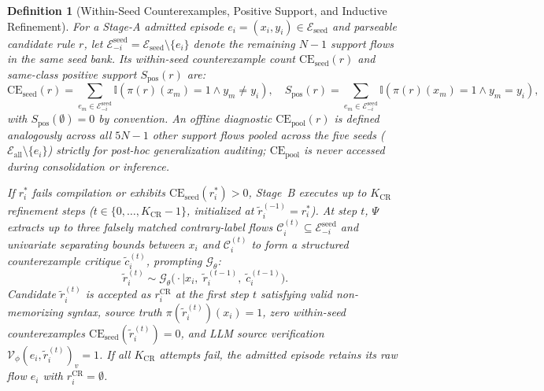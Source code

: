 \documentclass[11pt,letterpaper,onecolumn]{article}
\newtheorem{definition}{Definition}
\begin{document}
\begin{definition}[Within-Seed Counterexamples, Positive Support, and Inductive Refinement]
For a Stage-A admitted episode $e_i=(x_i,y_i) \in \mathcal{E}_{\mathrm{seed}}$ and parseable candidate rule $r$, let $\mathcal{E}_{-i}^{\mathrm{seed}} = \mathcal{E}_{\mathrm{seed}} \setminus \{e_i\}$ denote the remaining $N-1$ support flows in the same seed bank. Its within-seed counterexample count $\mathrm{CE}_{\mathrm{seed}}(r)$ and same-class positive support $S_{\mathrm{pos}}(r)$ are:
\begin{equation}
\label{eq:ce_count}
    \mathrm{CE}_{\mathrm{seed}}(r) = \sum_{e_m \in \mathcal{E}_{-i}^{\mathrm{seed}}} \mathbb{I}\!\left(\pi(r)(x_m) = 1 \wedge y_m \neq y_i\right), \quad
    S_{\mathrm{pos}}(r) = \sum_{e_m \in \mathcal{E}_{-i}^{\mathrm{seed}}} \mathbb{I}\!\left(\pi(r)(x_m) = 1 \wedge y_m = y_i\right),
\end{equation}
with $S_{\mathrm{pos}}(\emptyset) = 0$ by convention. An offline diagnostic $\mathrm{CE}_{\mathrm{pool}}(r)$ is defined analogously across all $5N - 1$ other support flows pooled across the five seeds ($\mathcal{E}_{\mathrm{all}} \setminus \{e_i\}$) strictly for post-hoc generalization auditing; $\mathrm{CE}_{\mathrm{pool}}$ is never accessed during consolidation or inference.

If $r_i^*$ fails compilation or exhibits $\mathrm{CE}_{\mathrm{seed}}(r_i^*) > 0$, Stage~B executes up to $K_{\mathrm{CR}}$ refinement steps ($t \in \{0, \dots, K_{\mathrm{CR}}-1\}$, initialized at $\tilde{r}_i^{(-1)} = r_i^*$). At step $t$, $\Psi$ extracts up to three falsely matched contrary-label flows $\mathcal{C}_i^{(t)} \subseteq \mathcal{E}_{-i}^{\mathrm{seed}}$ and univariate separating bounds between $x_i$ and $\mathcal{C}_i^{(t)}$ to form a structured counterexample critique $\tilde{c}_i^{(t)}$, prompting $\mathcal{G}_\theta$:
\begin{equation}
\label{eq:cr_gen}
    \tilde{r}_i^{(t)} \sim \mathcal{G}_\theta\big(\cdot \mid x_i,\; \tilde{r}_i^{(t-1)},\; \tilde{c}_i^{(t-1)}\big).
\end{equation}
Candidate $\tilde{r}_i^{(t)}$ is accepted as $r_i^{\mathrm{CR}}$ at the first step $t$ satisfying valid non-memorizing syntax, source truth $\pi(\tilde{r}_i^{(t)})(x_i)=1$, zero within-seed counterexamples $\mathrm{CE}_{\mathrm{seed}}(\tilde{r}_i^{(t)})=0$, and LLM source verification $\mathcal{V}_\phi(e_i, \tilde{r}_i^{(t)})_v = 1$. If all $K_{\mathrm{CR}}$ attempts fail, the admitted episode retains its raw flow $e_i$ with $r_i^{\mathrm{CR}} = \emptyset$.
\end{definition}
\end{document}
